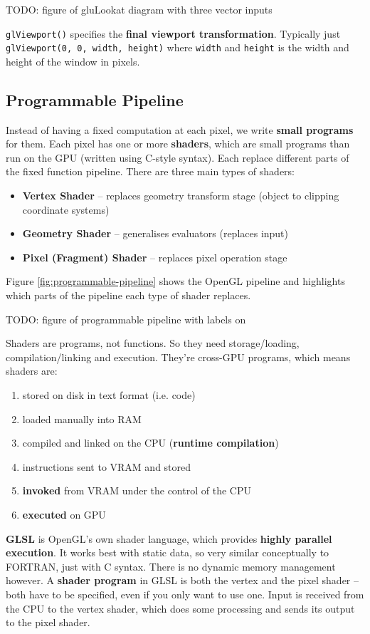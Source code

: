 \documentclass{article}
\begin{document}
TODO: figure of gluLookat diagram with three vector inputs

\texttt{glViewport()} specifies the \textbf{final viewport transformation}. Typically just \texttt{glViewport(0, 0, width, height)} where \texttt{width} and \texttt{height} is the width and height of the window in pixels.

\subsection{Programmable Pipeline}
\label{sec:programmable-pipeline}

Instead of having a fixed computation at each pixel, we write \textbf{small programs} for them. Each pixel has one or more \textbf{shaders}, which are small programs than run on the GPU (written using C-style syntax). Each replace different parts of the fixed function pipeline. There are three main types of shaders:
\begin{itemize}
	\item \textbf{Vertex Shader} -- replaces geometry transform stage (object to clipping coordinate systems)
	\item \textbf{Geometry Shader} -- generalises evaluators (replaces input)
	\item \textbf{Pixel (Fragment) Shader} -- replaces pixel operation stage
\end{itemize}
Figure \ref{fig:programmable-pipeline} shows the OpenGL pipeline and highlights which parts of the pipeline each type of shader replaces.

TODO: figure of programmable pipeline with labels on

Shaders are programs, not functions. So they need storage/loading, compilation/linking and execution. They're cross-GPU programs, which means shaders are:
\begin{enumerate}
	\item stored on disk in text format (i.e. code)
	\item loaded manually into RAM
	\item compiled and linked on the CPU (\textbf{runtime compilation})
	\item instructions sent to VRAM and stored
	\item \textbf{invoked} from VRAM under the control of the CPU
	\item \textbf{executed} on GPU
\end{enumerate}

\textbf{GLSL} is OpenGL's own shader language, which provides \textbf{highly parallel execution}. It works best with static data, so very similar conceptually to FORTRAN, just with C syntax. There is no dynamic memory management however. A \textbf{shader program} in GLSL is both the vertex and the pixel shader -- both have to be specified, even if you only want to use one. Input is received from the CPU to the vertex shader, which does some processing and sends its output to the pixel shader.
\end{document}
